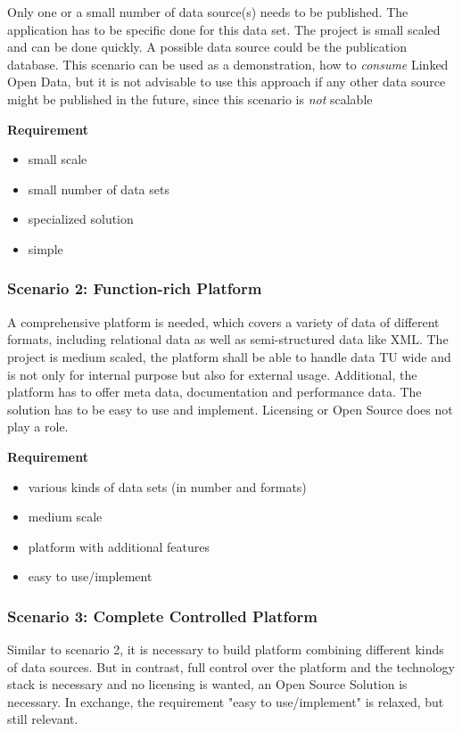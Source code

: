 Only one or a small number of data source(s) needs to be published. The application has to be specific done for this data set. The project is small scaled and can be done quickly. A possible data source could be the publication database. This scenario can be used as a demonstration, how to \emph{consume} Linked Open Data, but it is not advisable to use this approach if any other data source might be published in the future, since this scenario is \emph{not} scalable

\textbf{Requirement}
\begin{itemize}
\itemsep0pt
\item small scale
\item small number of data sets
\item specialized solution
\item simple
\end{itemize}

\subsubsection{Scenario 2: Function-rich Platform}

A comprehensive platform is needed, which covers a variety of data of different formats, including relational data as well as semi-structured data like XML. The project is medium scaled, the platform shall be able to handle data TU wide and is not only for internal purpose but also for external usage. Additional, the platform has to offer meta data, documentation and performance data. The solution has to be easy to use and implement. Licensing or Open Source does not play a role. 

\textbf{Requirement}
\begin{itemize}
\itemsep0pt
\item various kinds of data sets (in number and formats)
\item medium scale
\item platform with additional features
\item easy to use/implement
\end{itemize}

\subsubsection{Scenario 3: Complete Controlled Platform}

Similar to scenario 2, it is necessary to build platform combining different kinds of data sources. But in contrast, full control over the platform and the technology stack is necessary and no licensing is wanted, an Open Source Solution is necessary. In exchange, the requirement "easy to use/implement" is relaxed, but still relevant.

